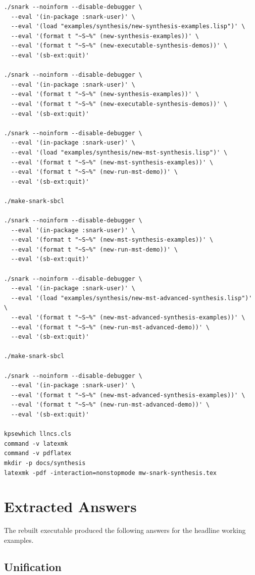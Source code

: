 \documentclass[runningheads]{llncs}
\begin{document}
\begin{lstlisting}
./snark --noinform --disable-debugger \
  --eval '(in-package :snark-user)' \
  --eval '(load "examples/synthesis/new-synthesis-examples.lisp")' \
  --eval '(format t "~S~%" (new-synthesis-examples))' \
  --eval '(format t "~S~%" (new-executable-synthesis-demos))' \
  --eval '(sb-ext:quit)'

./snark --noinform --disable-debugger \
  --eval '(in-package :snark-user)' \
  --eval '(format t "~S~%" (new-synthesis-examples))' \
  --eval '(format t "~S~%" (new-executable-synthesis-demos))' \
  --eval '(sb-ext:quit)'

./snark --noinform --disable-debugger \
  --eval '(in-package :snark-user)' \
  --eval '(load "examples/synthesis/new-mst-synthesis.lisp")' \
  --eval '(format t "~S~%" (new-mst-synthesis-examples))' \
  --eval '(format t "~S~%" (new-run-mst-demo))' \
  --eval '(sb-ext:quit)'

./make-snark-sbcl

./snark --noinform --disable-debugger \
  --eval '(in-package :snark-user)' \
  --eval '(format t "~S~%" (new-mst-synthesis-examples))' \
  --eval '(format t "~S~%" (new-run-mst-demo))' \
  --eval '(sb-ext:quit)'

./snark --noinform --disable-debugger \
  --eval '(in-package :snark-user)' \
  --eval '(load "examples/synthesis/new-mst-advanced-synthesis.lisp")' \
  --eval '(format t "~S~%" (new-mst-advanced-synthesis-examples))' \
  --eval '(format t "~S~%" (new-run-mst-advanced-demo))' \
  --eval '(sb-ext:quit)'

./make-snark-sbcl

./snark --noinform --disable-debugger \
  --eval '(in-package :snark-user)' \
  --eval '(format t "~S~%" (new-mst-advanced-synthesis-examples))' \
  --eval '(format t "~S~%" (new-run-mst-advanced-demo))' \
  --eval '(sb-ext:quit)'

kpsewhich llncs.cls
command -v latexmk
command -v pdflatex
mkdir -p docs/synthesis
latexmk -pdf -interaction=nonstopmode mw-snark-synthesis.tex
\end{lstlisting}

\section{Extracted Answers}

The rebuilt executable produced the following answers for the headline working
examples.

\subsection{Unification}
\end{document}
